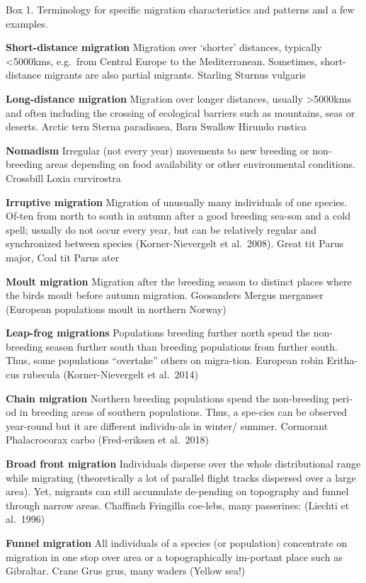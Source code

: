 \documentclass[
]{book}
\begin{document}
Box 1. Terminology for specific migration characteristics and patterns and a few examples.

\textbf{Short-distance migration} Migration over `shorter' distances, typically \textless5000kms, e.g.~from Central Europe to the Mediterranean. Sometimes, short-distance migrants are also partial migrants. Starling Sturnus vulgaris

\textbf{Long-distance migration} Migration over longer distances, usually \textgreater5000kms and often including the crossing of ecological barriers such as mountains, seas or deserts. Arctic tern Sterna paradisaea, Barn Swallow Hirundo rustica

\textbf{Nomadism} Irregular (not every year) movements to new breeding or non-breeding areas depending on food availability or other environmental conditions. Crossbill Loxia curvirostra

\textbf{Irruptive migration} Migration of unusually many individuals of one species. Of-ten from north to south in autumn after a good breeding sea-son and a cold spell; usually do not occur every year, but can be relatively regular and synchronized between species (Korner-Nievergelt et al.~2008). Great tit Parus major, Coal tit Parus ater

\textbf{Moult migration} Migration after the breeding season to distinct places where the birds moult before autumn migration. Goosanders Mergus merganser (European populations moult in northern Norway)

\textbf{Leap-frog migrations} Populations breeding further north spend the non-breeding season further south than breeding populations from further south. Thus, some populations ``overtake'' others on migra-tion. European robin Eritha-cus rubecula (Korner-Nievergelt et al.~2014)

\textbf{Chain migration} Northern breeding populations spend the non-breeding peri-od in breeding areas of southern populations. Thus, a spe-cies can be observed year-round but it are different individu-als in winter/ summer. Cormorant Phalacrocorax carbo (Fred-eriksen et al.~2018)

\textbf{Broad front migration} Individuals disperse over the whole distributional range while migrating (theoretically a lot of parallel flight tracks dispersed over a large area). Yet, migrants can still accumulate de-pending on topography and funnel through narrow areas. Chaffinch Fringilla coe-lebs, many passerines: (Liechti et al.~1996)

\textbf{Funnel migration} All individuals of a species (or population) concentrate on migration in one stop over area or a topographically im-portant place such as Gibraltar. Crane Grus grus, many waders (Yellow sea!)
\end{document}
